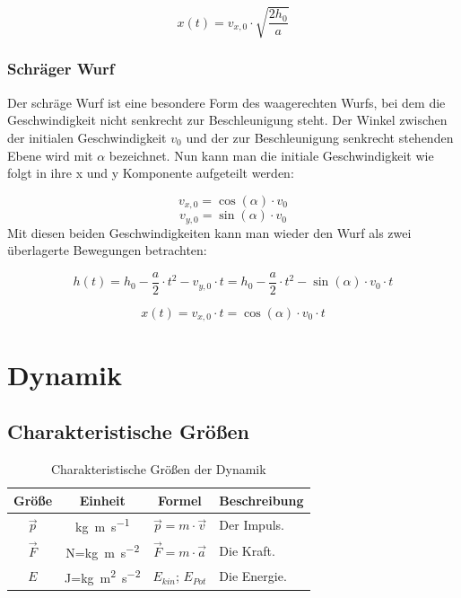 \documentclass[a4paper]{article}
\begin{document}
				\begin{equation}
					x(t) = v_{x,0}\cdot\sqrt{\frac{2h_0}{a}}
				\end{equation}
				
			\subsubsection{Schräger Wurf}
				Der schräge Wurf ist eine besondere Form des waagerechten Wurfs, bei dem die Geschwindigkeit nicht senkrecht zur Beschleunigung steht. Der Winkel zwischen der initialen Geschwindigkeit $v_0$ und der zur Beschleunigung senkrecht stehenden Ebene wird mit $\alpha$ bezeichnet. Nun kann man die initiale Geschwindigkeit wie folgt in ihre x und y Komponente aufgeteilt werden:
				
				\begin{equation}
					v_{x,0} = \cos(\alpha)\cdot v_0
				\end{equation}
				\begin{equation}
					v_{y,0} = \sin(\alpha)\cdot v_0
				\end{equation}
				Mit diesen beiden Geschwindigkeiten kann man wieder den Wurf als zwei \"uberlagerte Bewegungen betrachten:
				
				\begin{equation}
					h(t) = h_0 - \frac{a}{2}\cdot t^2 - v_{y,0}\cdot t = h_0 - \frac{a}{2}\cdot t^2 - \sin(\alpha)\cdot v_0\cdot t
				\end{equation}
				
				\begin{equation}
					x(t) = v_{x,0}\cdot t = \cos(\alpha)\cdot v_0\cdot t
				\end{equation}
			
	\section{Dynamik}
		\subsection{Charakteristische Größen}
	
			\begin{table}[H]
				\def\arraystretch{1.5}
				\begin{tabularx}{\textwidth}{|c|c|c|X|}\hline
					Größe & Einheit & Formel & Beschreibung \\\hline
					$\vec{p}$ & \si{\kg\meter\per\second} & $\vec{p} = m\cdot \vec{v}$ & Der Impuls.\\\hline
					$\vec{F}$ & \si{\newton}=\si{\kg\meter\per\second\squared}  & $	\vec{F} = m\cdot \vec{a}$ & Die Kraft.\\\hline
					$E$ & \si{\joule}=\si{\kg\meter\squared\per\second\squared} &\hyperref[energie_kin]{$E_{kin}$}; \hyperref[energie_pot]{$E_{Pot}$}  & Die Energie.\\\hline
				\end{tabularx}
				\caption {Charakteristische Größen der Dynamik}
				\label{table:dynamik_grossen}
			\end{table}
	
\end{document}
